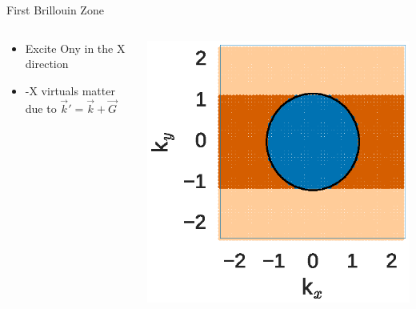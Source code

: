 \documentclass[10pt]{beamer}
\begin{document}
{{{{{{{{{{{{{{\begin{frame}{First Brillouin Zone}
	\begin{columns}[c] %
		\begin{column}{.4\textwidth}
			\begin{itemize}
				\item {Excite Ony in the X direction}
				\item {-X virtuals matter due to $\vec{k}' = \vec{k} + \vec{G}$}
			\end{itemize}
		\end{column}
		\hfill
		\begin{column}{0.6\textwidth}
		    \begin{overprint}
			    \includegraphics[width=\linewidth]{../images/1stBZ.eps}

			\end{overprint}
		\end{column}
	\end{columns}
\end{frame}

{%

}}}}}}}}}}}}}}}
\end{document}
